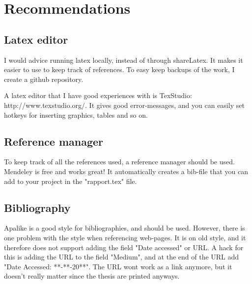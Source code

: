 \chapter{Recommendations}

\section{Latex editor}
I would advice running latex locally, instead of through shareLatex. It makes it easier to use to keep track of references. To easy keep backups of the work, I create a github repository. 

A latex editor that I have good experiences with is TexStudio: http://www.texstudio.org/. It gives good error-messages, and you can easily set hotkeys for inserting graphics, tables and so on.

\section{Reference manager}

To keep track of all the references used, a reference manager should be used. Mendeley is free and works great! 
It automatically creates a bib-file that you can add to your project in the "rapport.tex" file.

\section{Bibliography}
Apalike is a good style for bibliographies, and should be used. However, there is one problem with the style when referencing web-pages. It is on old style, and it therefore does not support adding the field "Date accessed" or URL. A hack for this is adding the URL to the field "Medium", and at the end of the URL add "Date Accessed: **-**-20**". The URL wont work as a link anymore, but it doesn't really matter since the thesis are printed anyways.